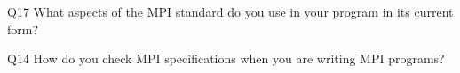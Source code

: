 \begin{description}%
\item{Q17} What aspects of the MPI standard do you use in your program in its current form?%
\item{Q14} How do you check MPI specifications when you are writing MPI programs?%
\end{description}%
